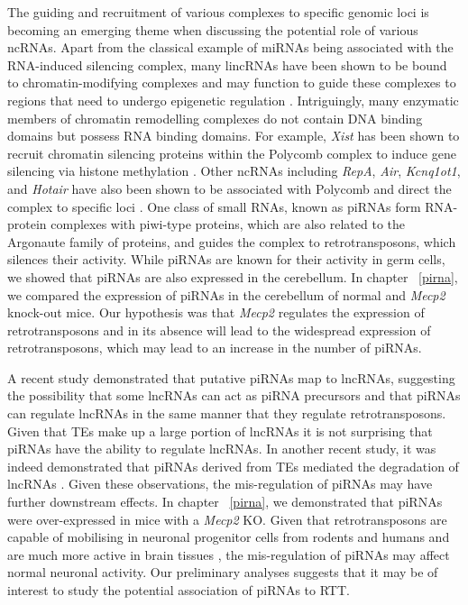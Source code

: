 The guiding and recruitment of various complexes to specific genomic loci is becoming an emerging theme when discussing the potential role of various ncRNAs. Apart from the classical example of miRNAs being associated with the RNA-induced silencing complex, many lincRNAs have been shown to be bound to chromatin-modifying complexes and may function to guide these complexes to regions that need to undergo epigenetic regulation \citep{pmid21915889,pmid19571010}. Intriguingly, many enzymatic members of chromatin remodelling complexes do not contain DNA binding domains but possess RNA binding domains. For example, \textit{Xist} has been shown to recruit chromatin silencing proteins within the Polycomb complex to induce gene silencing via histone methylation \citep{pmid17869504}. Other ncRNAs including \textit{RepA}, \textit{Air}, \textit{Kcnq1ot1}, and \textit{Hotair} have also been shown to be associated with Polycomb and direct the complex to specific loci \citep{pmid21915889}. One class of small RNAs, known as piRNAs form RNA-protein complexes with piwi-type proteins, which are also related to the Argonaute family of proteins, and guides the complex to retrotransposons, which silences their activity. While piRNAs are known for their activity in germ cells, we showed that piRNAs are also expressed in the cerebellum. In chapter ~\ref{pirna}, we compared the expression of piRNAs in the cerebellum of normal and \textit{Mecp2} knock-out mice. Our hypothesis was that \textit{Mecp2} regulates the expression of retrotransposons \citep{pmid21085180} and in its absence will lead to the widespread expression of retrotransposons, which may lead to an increase in the number of piRNAs.

A recent study demonstrated that putative piRNAs map to lncRNAs, suggesting the possibility that some lncRNAs can act as piRNA precursors \citep{pmid24981367} and that piRNAs can regulate lncRNAs in the same manner that they regulate retrotransposons. Given that TEs make up a large portion of lncRNAs \citep{pmid23637635} it is not surprising that piRNAs have the ability to regulate lncRNAs. In another recent study, it was indeed demonstrated that piRNAs derived from TEs mediated the degradation of lncRNAs \citep{Watanabe05122014}. Given these observations, the mis-regulation of piRNAs may have further downstream effects. In chapter ~\ref{pirna}, we demonstrated that piRNAs were over-expressed in mice with a \textit{Mecp2} KO. Given that retrotransposons are capable of mobilising in neuronal progenitor cells from rodents \citep{pmid15959507} and humans \citep{pmid19657334} and are much more active in brain tissues \citep{pmid22037309}, the mis-regulation of piRNAs may affect normal neuronal activity. Our preliminary analyses suggests that it may be of interest to study the potential association of piRNAs to RTT.

